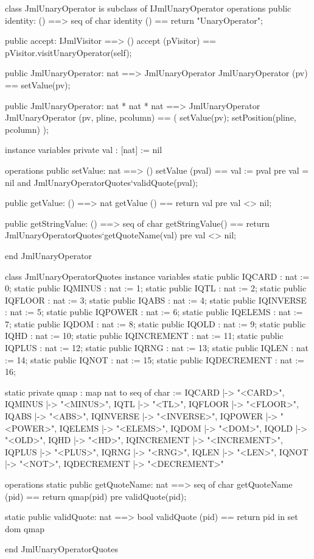 \begin{vdm_al}
class JmlUnaryOperator is subclass of IJmlUnaryOperator
operations
  public identity: () ==> seq of char
  identity () == return "UnaryOperator";

  public accept: IJmlVisitor ==> ()
  accept (pVisitor) == pVisitor.visitUnaryOperator(self);

  public JmlUnaryOperator: nat ==> JmlUnaryOperator
  JmlUnaryOperator (pv) == setValue(pv);

  public JmlUnaryOperator: nat * nat * nat ==> JmlUnaryOperator
  JmlUnaryOperator (pv, pline, pcolumn) == ( setValue(pv); setPosition(pline, pcolumn) );

instance variables
  private val : [nat] := nil

operations
  public setValue: nat ==> ()
  setValue (pval) == val := pval
    pre val = nil and JmlUnaryOperatorQuotes`validQuote(pval);

  public getValue: () ==> nat
  getValue () == return val
    pre val <> nil;

  public getStringValue: () ==> seq of char
  getStringValue() == return JmlUnaryOperatorQuotes`getQuoteName(val)
    pre val <> nil;

end JmlUnaryOperator
\end{vdm_al}
\begin{vdm_al}
class JmlUnaryOperatorQuotes
instance variables
  static public IQCARD : nat := 0;
  static public IQMINUS : nat := 1;
  static public IQTL : nat := 2;
  static public IQFLOOR : nat := 3;
  static public IQABS : nat := 4;
  static public IQINVERSE : nat := 5;
  static public IQPOWER : nat := 6;
  static public IQELEMS : nat := 7;
  static public IQDOM : nat := 8;
  static public IQOLD : nat := 9;
  static public IQHD : nat := 10;
  static public IQINCREMENT : nat := 11;
  static public IQPLUS : nat := 12;
  static public IQRNG : nat := 13;
  static public IQLEN : nat := 14;
  static public IQNOT : nat := 15;
  static public IQDECREMENT : nat := 16;

  static private qmap : map nat to seq of char :=
    { IQCARD |-> "<CARD>",
      IQMINUS |-> "<MINUS>",
      IQTL |-> "<TL>",
      IQFLOOR |-> "<FLOOR>",
      IQABS |-> "<ABS>",
      IQINVERSE |-> "<INVERSE>",
      IQPOWER |-> "<POWER>",
      IQELEMS |-> "<ELEMS>",
      IQDOM |-> "<DOM>",
      IQOLD |-> "<OLD>",
      IQHD |-> "<HD>",
      IQINCREMENT |-> "<INCREMENT>",
      IQPLUS |-> "<PLUS>",
      IQRNG |-> "<RNG>",
      IQLEN |-> "<LEN>",
      IQNOT |-> "<NOT>",
      IQDECREMENT |-> "<DECREMENT>" }

operations
  static public getQuoteName: nat ==> seq of char
  getQuoteName (pid) ==
    return qmap(pid)
    pre validQuote(pid);

  static public validQuote: nat ==> bool
  validQuote (pid) == return pid in set dom qmap

end JmlUnaryOperatorQuotes
\end{vdm_al}
